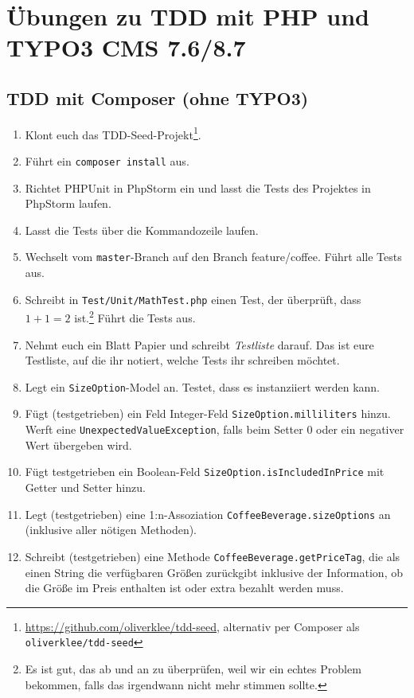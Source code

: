 \documentclass[a4paper,12pt]{scrartcl}
\begin{document}
\raggedbottom

\section{Übungen zu TDD mit PHP und TYPO3 CMS 7.6/8.7}

\subsection{TDD mit Composer (ohne TYPO3)}
\begin{enumerate}
  \item Klont euch das TDD-Seed-Projekt\footnote{\url{https://github.com/oliverklee/tdd-seed}, alternativ per Composer als \texttt{oliverklee/tdd-seed}}.
  \item Führt ein \texttt{composer install} aus.
  \item Richtet PHPUnit in PhpStorm ein und lasst die Tests des Projektes in PhpStorm laufen.
  \item Lasst die Tests über die Kommandozeile laufen.
  \item Wechselt vom \texttt{master}-Branch auf den Branch {feature/coffee}. Führt alle Tests aus.
  \item Schreibt in \texttt{Test/Unit/MathTest.php} einen Test, der überprüft, dass $1 + 1 = 2$ ist.\footnote{Es ist gut, das ab und an zu überprüfen, weil wir ein echtes Problem bekommen, falls das irgendwann nicht mehr stimmen sollte.} Führt die Tests aus.
  \item Nehmt euch ein Blatt Papier und schreibt \emph{Testliste} darauf. Das ist eure Testliste, auf die ihr notiert, welche Tests ihr schreiben möchtet.
  \item Legt ein \texttt{SizeOption}-Model an. Testet, dass es instanziiert werden kann.
  \item Fügt (testgetrieben) ein Feld Integer-Feld \texttt{SizeOption.milliliters}  hinzu. Werft eine \texttt{UnexpectedValueException}, falls beim Setter 0 oder ein negativer Wert übergeben wird.
  \item Fügt testgetrieben ein Boolean-Feld \texttt{SizeOption.isIncludedInPrice} mit Getter und Setter hinzu.
  \item Legt (testgetrieben) eine 1:n-Assoziation \texttt{CoffeeBeverage.sizeOptions} an (inklusive aller nötigen Methoden).
  \item Schreibt (testgetrieben) eine Methode \texttt{CoffeeBeverage.getPriceTag}, die als einen String die verfügbaren Größen zurückgibt inklusive der Information, ob die Größe im Preis enthalten ist oder extra bezahlt werden muss.
\end{enumerate}
\pagebreak
\end{document}
